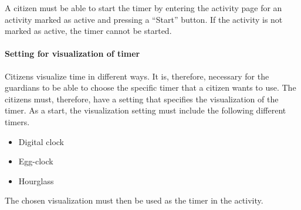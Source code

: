 A citizen must be able to start the timer by entering the activity page for an activity marked as active and pressing a “Start” button. If the activity is not marked as active, the timer cannot be started.

\paragraph{Setting for visualization of timer}

Citizens visualize time in different ways. It is, therefore, necessary for the guardians to be able to choose the specific timer that a citizen wants to use. The citizens must, therefore, have a setting that specifies the visualization of the timer. As a start, the visualization setting must include the following different timers.

\begin{itemize}
    \item Digital clock
    \item Egg-clock
    \item Hourglass
\end{itemize}
The chosen visualization must then be used as the timer in the activity.

